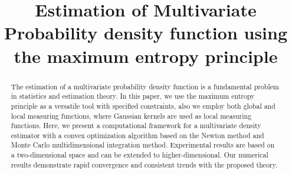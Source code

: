 \documentclass[conference]{IEEEtran}
\begin{document}
	
	
	\title{Estimation of Multivariate Probability density function using the maximum entropy principle}
	
	
	
	
	
	
	\maketitle
	
\begin{abstract}
%
The estimation of a multivariate probability density function is a fundamental problem in statistics and estimation theory. In this paper, we use the maximum entropy principle as a versatile tool with specified constraints, also we employ both global and local measuring functions, where Gaussian kernels are used as local measuring functions. Here, we present a computational framework for a multivariate density estimator with a convex optimization algorithm based on the Newton method and Monte Carlo multidimensional integration method. Experimental results are based on a two-dimensional space and can be extended to higher-dimensional. Our numerical results demonstrate rapid convergence and consistent trends with the proposed theory.
\end{abstract}
	
	
\end{document}
